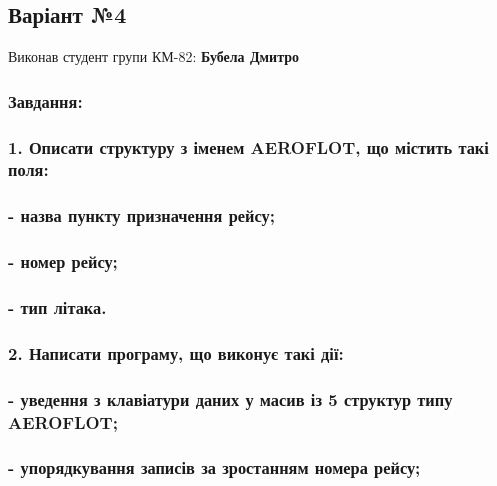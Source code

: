 \begin{center} \subsection*{Варіант №4}\end{center} 

\begin{center} \end{center}  Виконав студент групи КМ-\/82\+: {\bfseries Бубела Дмитро}~\newline
 \subsubsection*{Завдання\+:}

\subsubsection*{1. Описати структуру з іменем A\+E\+R\+O\+F\+L\+OT, що містить такі поля\+:}

\subsubsection*{-\/ назва пункту призначення рейсу;}

\subsubsection*{-\/ номер рейсу;}

\subsubsection*{-\/ тип літака.}

\subsubsection*{2. Написати програму, що виконує такі дії\+:}

\subsubsection*{-\/ уведення з клавіатури даних у масив із 5 структур типу A\+E\+R\+O\+F\+L\+OT;}

\subsubsection*{-\/ упорядкування записів за зростанням номера рейсу;}

